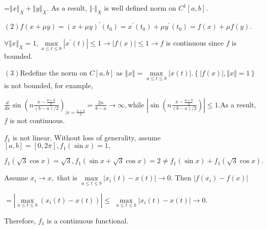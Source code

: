 \documentclass{article}
\begin{document}
=$\left\Vert x\right\Vert _{X}+\left\Vert y\right\Vert _{X}.$ As a result, $%
\left\Vert \cdot \right\Vert _{X}$ is well defined norm on $C^{1}\left[ a,b%
\right] .$

$\left( 2\right) f\left( x+\mu y\right) =\left( x+\mu y\right) ^{\prime
}\left( t_{0}\right) =x^{\prime }\left( t_{0}\right) +\mu y^{\prime }\left(
t_{0}\right) =f\left( x\right) +\mu f\left( y\right) .$

$\forall \left\Vert x\right\Vert _{X}=1,\underset{a\leq t\leq b}{\max }%
\left\vert x^{\prime }\left( t\right) \right\vert \leq 1\rightarrow
\left\vert f\left( x\right) \right\vert \leq 1\rightarrow f$ is continuous
since $f$ is bounded.

$\left( 3\right) $Redefine the norm on  $C\left[ a,b\right] $ as $\left\Vert
x\right\Vert =\underset{a\leq t\leq b}{\max }\left\vert x\left( t\right)
\right\vert .\left\{ \left\vert f\left( x\right) \right\vert ,\left\Vert
x\right\Vert =1\right\} $ is not bounded, for example,

$\frac{d}{dx}\sin \left( n\frac{x-\frac{a+b}{2}}{\left( b-a\right) /2}%
\right) _{|x=\frac{a+b}{2}}=\frac{2n}{b-a}\rightarrow \infty ,$while $%
\left\vert \sin \left( n\frac{x-\frac{a+b}{2}}{\left( b-a\right) /2}\right)
\right\vert \leq 1.$As a result, $f$ is not continuous.


$f_{1}$ is not linear. Without loss of generality, assume $\left[ a,b\right]
=\left[ 0,2\pi \right] ,f_{1}\left( \sin x\right) =1,$

$f_{1}\left( \sqrt{3}\cos x\right) =\sqrt{3},f_{1}\left( \sin x+\sqrt{3}\cos
x\right) =2\neq f_{1}\left( \sin x\right) +f_{1}\left( \sqrt{3}\cos x\right)
.$

Assume $x_{i}\rightarrow x,$ that is $\underset{a\leq t\leq b}{\max }%
\left\vert x_{i}\left( t\right) -x\left( t\right) \right\vert \rightarrow 0.$%
Then $\left\vert f\left( x_{i}\right) -f\left( x\right) \right\vert $

$=\left\vert \underset{a\leq t\leq b}{\max }\left( x_{i}\left( t\right)
-x\left( t\right) \right) \right\vert \leq $ $\underset{a\leq t\leq b}{\max }%
\left\vert x_{i}\left( t\right) -x\left( t\right) \right\vert \rightarrow 0.$

Therefore, $f_{1}$ is a continuous functional.
\end{document}
